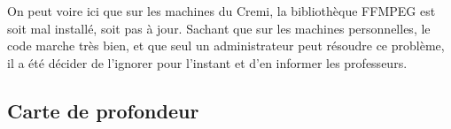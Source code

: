 \documentclass{article}
\begin{document}
On peut voire ici que sur les machines du Cremi, la bibliothèque FFMPEG est soit mal installé, soit pas à jour. Sachant que sur les machines personnelles, le code marche très bien, et que seul un administrateur peut résoudre ce problème, il a été décider de l'ignorer pour l'instant et d'en informer les professeurs.

\newpage
\subsection{Carte de profondeur}

\end{document}
